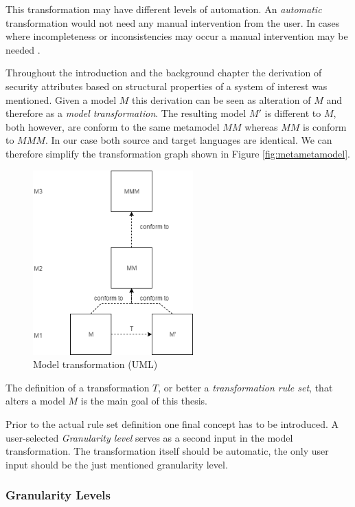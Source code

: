 This transformation may have different levels of automation. An \textit{automatic} transformation would not need any manual intervention from the user. In cases where incompleteness or inconsistencies may occur a manual intervention may be needed \cite{mt_taxonomy}.

Throughout the introduction and the background chapter the derivation of security attributes based on structural properties of a system of interest was mentioned. Given a model $M$ this derivation can be seen as alteration of $M$ and therefore as a \textit{model transformation}. The resulting model $M'$ is different to $M$, both however, are conform to the same metamodel $MM$ whereas $MM$ is conform to $MMM$. In our case both source and target languages are identical. We can therefore simplify the transformation graph shown in Figure \ref{fig:metametamodel}.

\begin{figure}[H]
\centering
\includegraphics[width=0.55\textwidth]{pictures/transformation.png}
\caption{Model transformation (UML)}
\label{fig:transformation}
\end{figure}

The definition of a transformation $T$, or better a \textit{transformation rule set}, that alters a model $M$ is the main goal of this thesis.

Prior to the actual rule set definition one final concept has to be introduced. A user-selected \textit{Granularity level} serves as a second input in the model transformation. The transformation itself should be automatic, the only user input should be the just mentioned granularity level.

\subsubsection{Granularity Levels}
\label{subsubsec:granularity}

